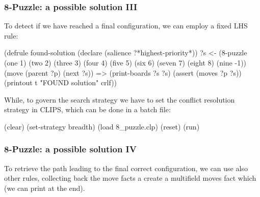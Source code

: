 \documentclass[xcolor={usenames,dvipsnames,svgnames}, compress]{beamer}
\begin{document}
\begin{frame}[fragile]
  \frametitle{8-Puzzle: a possible solution III}
  To detect if we have reached a final configuration, we can employ a
  fixed LHS rule:
  \begin{clips-code}[numbers=none]
    (defrule found-solution
        (declare (salience ?*highest-priority*))
        ?s <- (8-puzzle (one 1) (two 2) (three 3)
                        (four 4) (five 5) (six 6) 
                        (seven 7) (eight 8) (nine -1))
        (move (parent ?p) (next ?s))
        =>
        (print-boards ?s ?s)
        (assert (moves ?p ?s))
        (printout t "FOUND solution" crlf))
      \end{clips-code}

   While, to govern the search strategy we have to set the conflict
   resolution strategy in CLIPS, which can be done in a batch file:
   \begin{clips-code}[numbers=none]
     (clear)
     (set-strategy breadth)
     (load 8_puzzle.clp)
     (reset)
     (run)
 \end{clips-code}
\end{frame}

\begin{frame}[fragile]
  \frametitle{8-Puzzle: a possible solution IV}
  To retrieve the path leading to the final correct configuration, we
  can use also other rules, collecting back the \textsf{move} facts a create a
  multifield \textsf{moves} fact which (we can print at the end).
\end{frame}
\end{document}
